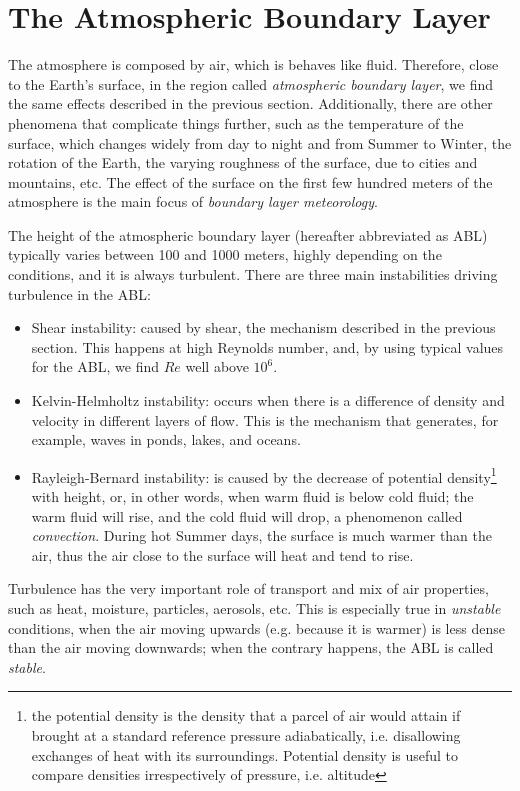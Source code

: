 \documentclass[12pt]{book}
\begin{document}
\section{The Atmospheric Boundary Layer}
The atmosphere is composed by air, which is behaves like fluid. Therefore, close to the Earth's surface, in the region called \emph{atmospheric boundary layer}, we find the same effects described in the previous section. Additionally, there are other phenomena that complicate things further, such as the temperature of the surface, which changes widely from day to night and from Summer to Winter, the rotation of the Earth, the varying roughness of the surface, due to cities and mountains, etc. The effect of the surface on the first few hundred meters of the atmosphere is the main focus of \emph{boundary layer meteorology}. 

The height of the atmospheric boundary layer (hereafter abbreviated as ABL) typically varies between 100 and 1000 meters, highly depending on the conditions, and it is always turbulent. There are three main instabilities driving turbulence in the ABL:

\begin{itemize}
\item Shear instability: caused by shear, the mechanism described in the previous section. This happens at high Reynolds number, and, by using typical values for the ABL, we find $Re$ well above $10^6$.
\item Kelvin-Helmholtz instability: occurs when there is a difference of density and velocity in different layers of flow. This is the mechanism that generates, for example, waves in ponds, lakes, and oceans.
\item Rayleigh-Bernard instability: is caused by the decrease of potential density\footnote{the potential density is the density that a parcel of air would attain if brought at a standard reference pressure adiabatically, i.e. disallowing exchanges of heat with its surroundings. Potential density is useful to compare densities irrespectively of pressure, i.e. altitude} with height, or, in other words, when warm fluid is below cold fluid; the warm fluid will rise, and the cold fluid will drop, a phenomenon called \emph{convection}. During hot Summer days, the surface is much warmer than the air, thus the air close to the surface will heat and tend to rise.
\end{itemize}

Turbulence has the very important role of transport and mix of air properties, such as heat, moisture, particles, aerosols, etc. This is especially true in \emph{unstable} conditions, when the air moving upwards (e.g. because it is warmer) is less dense than the air moving downwards; when the contrary happens, the ABL is called \emph{stable}.
\end{document}
